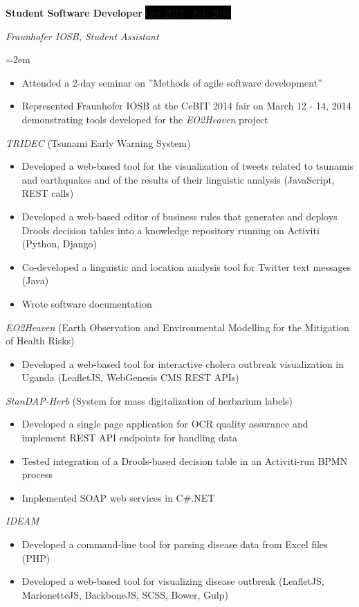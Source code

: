 \documentclass[paper=a4,fontsize=11pt]{scrartcl} %
\newcommand{\sepspace}{\vspace*{1em}}		%
\newcommand{\EducationEntry}[4]{
		\noindent \textbf{#1} \hfill      %
		\colorbox{Black}{%
			\parbox{6em}{%
			\hfill\color{White}#2}} \par  %
		\noindent \textit{#3} \par        %
		\noindent\hangindent=2em\hangafter=0 \small #4 %
		\normalsize \par}
\newcommand{\WorkEntry}[4]{				  %
		\noindent \textbf{#1} \hfill      %
		\colorbox{Black}{\color{White}#2} \par  %
		\noindent \textit{#3} \par              %
		\noindent\hangindent=2em\hangafter=0 \small #4 %
		\normalsize \par}
\begin{document}
\WorkEntry{Student Software Developer}{Oct 2012 - Feb 2016}{Fraunhofer IOSB, Student Assistant}{
\begin{itemize}
    \item Attended a 2-day seminar on ''Methods of agile software development''
    \item Represented Fraunhofer IOSB at the CeBIT 2014 fair on March 12 - 14, 2014 demonstrating tools developed for the \emph{EO2Heaven} project
\end{itemize}

\emph{TRIDEC} (Tsunami Early Warning System)
\begin{itemize}
    \item Developed a web-based tool for the visualization of tweets related to tsunamis and earthquakes and of the results of their linguistic analysis (JavaScript, REST calls)
    \item Developed a web-based editor of business rules that generates and deploys Drools decision tables into a knowledge repository running on Activiti (Python, Django)
    \item Co-developed a linguistic and location analysis tool for Twitter text messages (Java) 
    \item Wrote software documentation
\end{itemize}
\sepspace
\emph{EO2Heaven} (Earth Observation and Environmental Modelling for the Mitigation of Health Risks)
\begin{itemize}
    \item Developed a web-based tool for interactive cholera outbreak visualization in Uganda (LeafletJS, WebGenesis CMS REST APIs)
\end{itemize}
\sepspace
\emph{StanDAP-Herb} (System for mass digitalization of herbarium labels)
\begin{itemize}
    \item Developed a single page application for OCR quality assurance and implement REST API endpoints for handling data
    \item Tested integration of a Drools-based decision table in an Activiti-run BPMN process
    \item Implemented SOAP web services in C\#.NET
\end{itemize}
\sepspace
\emph{IDEAM}
\begin{itemize}
    \item Developed a command-line tool for parsing disease data from Excel files (PHP)
    \item Developed a web-based tool for visualizing disease outbreak (LeafletJS, MarionetteJS, BackboneJS, SCSS, Bower, Gulp)
\end{itemize}}
\sepspace
\end{document}
